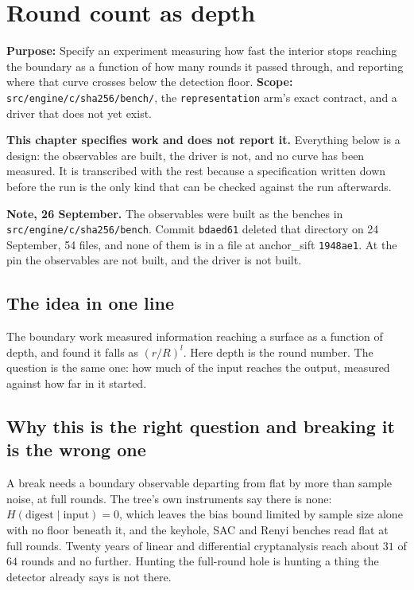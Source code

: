 \chapter{Round count as depth}

\textbf{Purpose:} Specify an experiment measuring how fast the interior stops reaching the boundary as a function of how many rounds it passed through, and reporting where that curve crosses below the detection floor. \textbf{Scope:} \texttt{src/\allowbreak{}engine/\allowbreak{}c/\allowbreak{}sha256/\allowbreak{}bench/}, the \texttt{representation} arm's exact contract, and a driver that does not yet exist.

\textbf{This chapter specifies work and does not report it.} Everything below is a design: the observables are built, the driver is not, and no curve has been measured. It is transcribed with the rest because a specification written down before the run is the only kind that can be checked against the run afterwards.

\textbf{Note, 26 September.} The observables were built as the benches in \texttt{src/\allowbreak{}engine/\allowbreak{}c/\allowbreak{}sha256/\allowbreak{}bench}. Commit \texttt{bdaed61} deleted that directory on 24 September, 54 files, and none of them is in a file at anchor\_sift \texttt{1948ae1}. At the pin the observables are not built, and the driver is not built.

\section{The idea in one line}

The boundary work measured information reaching a surface as a function of depth, and found it falls as \((r/R)^l\). Here depth is the round number. The question is the same one: how much of the input reaches the output, measured against how far in it started.

\section{Why this is the right question and breaking it is the wrong one}

A break needs a boundary observable departing from flat by more than sample noise, at full rounds. The tree's own instruments say there is none: \(H(\text{digest} \mid \text{input}) = 0\), which leaves the bias bound limited by sample size alone with no floor beneath it, and the keyhole, SAC and Renyi benches read flat at full rounds. Twenty years of linear and differential cryptanalysis reach about \(31\) of \(64\) rounds and no further. Hunting the full-round hole is hunting a thing the detector already says is not there.

